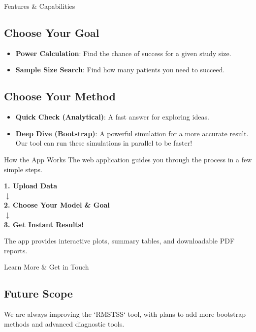 \documentclass[a0,landscape]{a0poster}
\begin{document}
\begin{multicols}{3}
\begin{posterbox}{Features \& Capabilities}
    \subsection*{\Huge Choose Your Goal}
    \huge
    \begin{itemize} \itemsep=0.75em
        \item \textbf{Power Calculation}: Find the chance of success for a given study size.
        \item \textbf{Sample Size Search}: Find how many patients you need to succeed.
    \end{itemize}

    \subsection*{\Huge Choose Your Method}
    \huge
    \begin{itemize} \itemsep=0.75em
        \item \textbf{Quick Check (Analytical)}: A fast answer for exploring ideas.
        \item \textbf{Deep Dive (Bootstrap)}: A powerful simulation for a more accurate result. Our tool can run these simulations in parallel to be faster!
    \end{itemize}

\end{posterbox}

\columnbreak

\begin{posterbox}{How the App Works}
    \huge
    The web application guides you through the process in a few simple steps.
    \begin{center}
        \Huge
        \textbf{1. Upload Data} \\[1cm]
        $\boldsymbol{\downarrow}$ \\[1cm]
        \textbf{2. Choose Your Model \& Goal} \\[1cm]
        $\boldsymbol{\downarrow}$ \\[1cm]
        \textbf{3. Get Instant Results!}
    \end{center}
    \huge
    The app provides interactive plots, summary tables, and downloadable PDF reports.
\end{posterbox}

\begin{posterbox}{Learn More \& Get in Touch}
    \subsection*{\Huge Future Scope}
    \huge
    We are always improving the `RMSTSS` tool, with plans to add more bootstrap methods and advanced diagnostic tools.


\end{posterbox}
\end{multicols}
\end{document}
